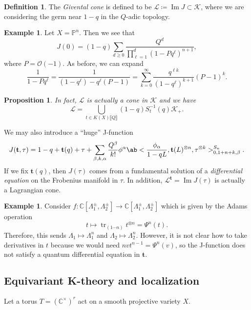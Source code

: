 \documentclass{amsart}
\newtheorem{prop}[thm]{Proposition}
\theoremstyle{definition}
\newtheorem{defn}[thm]{Definition}
\newtheorem{exm}[thm]{Example}
\theoremstyle{remark}
\theoremstyle{plain}
\theoremstyle{definition}
\theoremstyle{remark}
\DeclareMathOperator{\Ima}{Im}
\newcommand{\C}{\mathbb{C}}
\renewcommand{\P}{\mathbb{P}}
\newcommand{\mc}[1]{\mathcal{#1}}
\newcommand{\on}[1]{\operatorname{#1}}
\newcommand{\1}{\mathbf{1}}
\newcommand{\2}{\mathbf{2}}
\newcommand{\3}{\mathbf{3}}
\newcommand{\ps}[1]{\llbracket #1 \rrbracket}
\begin{document}
\begin{defn}
    The \textit{Givental cone} is defined to be \(\mc{L} \coloneqq \Ima J \subset \mc{K}\), where we are considering the germ near \(1-q\) in the \(Q\)-adic topology.
\end{defn}

\begin{exm}
    Let \(X = \P^n\). Then we see that
    \[ J(0) = (1-q) \sum_{d \geq 0} \frac{Q^d}{\prod_{\ell=1}^d (1-Pq^{\ell})^{n+1}}, \]
    where \(P = \mc{O}(-1)\). As before, we can expand
    \[ \frac{1}{1-P q^{\ell}} = \frac{1}{(1-q^{\ell}) - q^{\ell}(P-1)} = \sum_{k=0}^{\infty} \frac{q^{\ell k}}{(1-q^{\ell})^{k+1}}(P-1)^k. \]
\end{exm}

\begin{prop}
    In fact, \(\mc{L}\) is actually a cone in \(\mc{K}\) and we have
    \[ \mc{L} = \bigcup_{t \in K(X)\ps{Q}} (1-q) S_{t}^{-1}(q) \mc{K}_+. \]
\end{prop}

We may also introduce a ``huge'' J-function
\[ J(\mathbf{t}, \tau) = 1-q + \mathbf{t}(q) + \tau + \sum_{\beta, k, \alpha} \frac{Q^{\beta}}{k!} \phi^{\alpha} \ab< \frac{\phi_{\alpha}}{1-qL}, \mathbf{t}(L)^{\otimes n}, \tau^{\otimes k}>_{0,1+n+k,\beta}^{S_n}. \]
If we fix \(\mathbf{t}(q)\), then \(J(\tau)\) comes from a fundamental solution of a \textit{differential equation} on the Frobenius manifold in \(\tau\). In addition, \(\mc{L}^{\mathbf{t}}=  \Ima J(\tau)\) is actually a Lagrangian cone.

\begin{exm}
    Consider \(f \colon \C[\Lambda_1^{\pm}, \Lambda_2^{\pm}] \to \C[\Lambda_1^{\pm}, \Lambda_2^{\pm}]\) which is given by the Adams operation
    \[ t \mapsto \on{tr}_{(1\cdots n)} t^{\otimes n} = \Psi^n (t). \]
    Therefore, this sends \(\Lambda_1 \mapsto \Lambda_1^n\) and \(\Lambda_2 \mapsto \Lambda_2^n\). However, it is not clear how to take derivatives in \(t\) because we would need \(nv t^{n-1} = \Psi^n(v)\), so the J-function does not satisfy a quantum differential equation in \(\mathbf{t}\).
\end{exm}

\subsection{Equivariant K-theory and localization}%
\label{sub:Equivariant K-theory and localization}

Let a torus \(T = (\C^{\times})^r\) act on a smooth projective variety \(X\).
\end{document}
